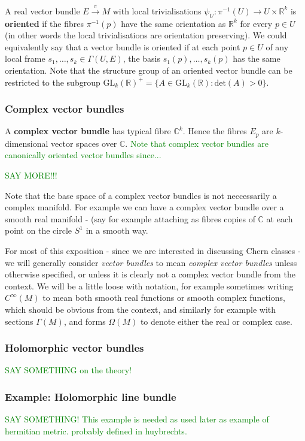 \documentclass[a4paper]{article}
\theoremstyle{definition} \newtheorem*{definition}{Definition}
\theoremstyle{definition} \newtheorem*{definitions}{Definitions}
\theoremstyle{plain} \newtheorem{theorem}{Theorem}[section]
\theoremstyle{plain} \newtheorem{proposition}[theorem]{Proposition}
\theoremstyle{plain} \newtheorem{corollary}[theorem]{Corollary}
\theoremstyle{plain} \newtheorem{lemma}[theorem]{Lemma}
\theoremstyle{plain} \newtheorem{example}[theorem]{Example}
\newcommand{\finish}[1]{\textcolor{green}{#1}}
\newcommand{\defn}[1]{\textbf{#1}}
\newcommand{\realnos}{\mathbb{R}}
\newcommand{\complexnos}{\mathbb{C}}
\begin{document}
A real vector bundle $E\xrightarrow{\pi} M$ with local trivialisations $\psi_U:\pi^{-1}(U)\to U\times \realnos^k$ is \defn{oriented} if the fibres $\pi^{-1}(p)$ have the same orientation as $\realnos^k$ for every $p \in U$ 
(in other words the local trivialisations are orientation preserving). 
We could equivalently say that a vector bundle is oriented if at each point $p\in U$ of any local frame $s_1, \ldots, s_k\in \Gamma(U, E)$, the basis $s_1(p), \ldots, s_k(p)$ has the same orientation. 
Note that the structure group of an oriented vector bundle can be restricted to the subgroup $\mathrm{GL}_k(\realnos)^+=\{A\in \mathrm{GL}_k(\realnos): \mathrm{det}(A)>0\}$.

\subsubsection{Complex vector bundles}

A \defn{complex vector bundle} has typical fibre $\complexnos^k$. Hence the fibres $E_p$ are $k$-dimensional vector spaces over $\complexnos$. \finish{Note that complex vector bundles are canonically oriented vector bundles since...} 

\finish{SAY MORE!!!}

Note that the base space of a complex vector bundles is not neccessarily a complex manifold. For example we can have a complex vector bundle over a smooth real manifold - (say for example attaching as fibres copies of $\complexnos$ at each point on the circle $S^1$ in a smooth way. 

For most of this exposition - since we are interested in discussing Chern classes - we will generally consider \emph{vector bundles} to mean \emph{complex vector bundles} unless otherwise specified, or unless it is clearly not a complex vector bundle from the context. We will be a little loose with notation, for example sometimes writing $C^\infty (M)$ to mean both smooth real functions or smooth complex functions, which should be obvious from the context, and similarly for example with  sections $\Gamma(M)$, and forms $\Omega(M)$ to denote either the real or complex case. 

\subsubsection{Holomorphic vector bundles}
\finish{SAY SOMETHING on the theory!}

\subsubsection{Example: Holomorphic line bundle}
\finish{SAY SOMETHING! This example is needed as used later as example of hermitian metric. probably defined in huybrechts.}
\end{document}
